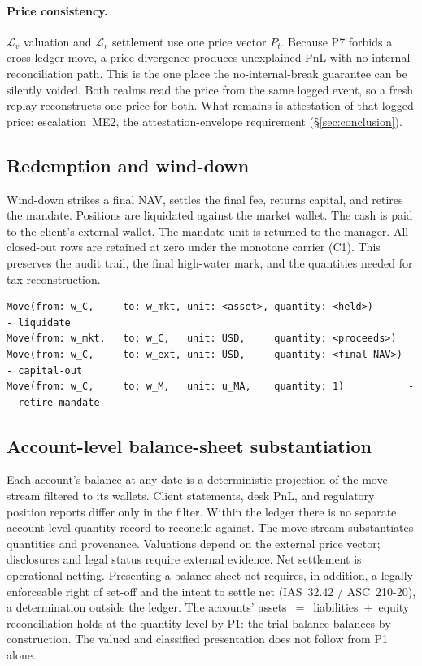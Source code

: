 \paragraph{Price consistency.} $\mathcal{L}_v$ valuation and $\mathcal{L}_r$ settlement use
one price vector $P_t$. Because P7 forbids a cross-ledger move, a price divergence produces
unexplained PnL with no internal reconciliation path. This is the one place the
no-internal-break guarantee can be silently voided. Both realms read the price from the same
logged event, so a fresh replay reconstructs one price for both. What remains is attestation
of that logged price: escalation~ME2, the attestation-envelope requirement
(\S\ref{sec:conclusion}).

\subsection{Redemption and wind-down}
\label{sec:managed-redemption}

Wind-down strikes a final NAV, settles the final fee, returns capital, and retires the
mandate. Positions are liquidated against the market wallet. The cash is paid to the
client's external wallet. The mandate unit is returned to the manager. All closed-out rows
are retained at zero under the monotone carrier (C1). This preserves the audit trail, the
final high-water mark, and the quantities needed for tax reconstruction.
\begin{lstlisting}
Move(from: w_C,     to: w_mkt, unit: <asset>, quantity: <held>)      -- liquidate
Move(from: w_mkt,   to: w_C,   unit: USD,     quantity: <proceeds>)
Move(from: w_C,     to: w_ext, unit: USD,     quantity: <final NAV>) -- capital-out
Move(from: w_C,     to: w_M,   unit: u_MA,    quantity: 1)           -- retire mandate
\end{lstlisting}

\subsection{Account-level balance-sheet substantiation}
\label{sec:managed-substantiation}

Each account's balance at any date is a deterministic projection of the move stream filtered
to its wallets. Client statements, desk PnL, and regulatory position reports differ only in
the filter. Within the ledger there is no separate account-level quantity record to
reconcile against. The move stream substantiates quantities and provenance. Valuations
depend on the external price vector; disclosures and legal status require external evidence.
Net settlement is operational netting. Presenting a balance sheet net requires, in addition,
a legally enforceable right of set-off and the intent to settle net (IAS~32.42 /
ASC~210-20), a determination outside the ledger. The accounts'
assets~$=$~liabilities~$+$~equity reconciliation holds at the quantity level by P1: the
trial balance balances by construction. The valued and classified presentation does not
follow from P1 alone.

